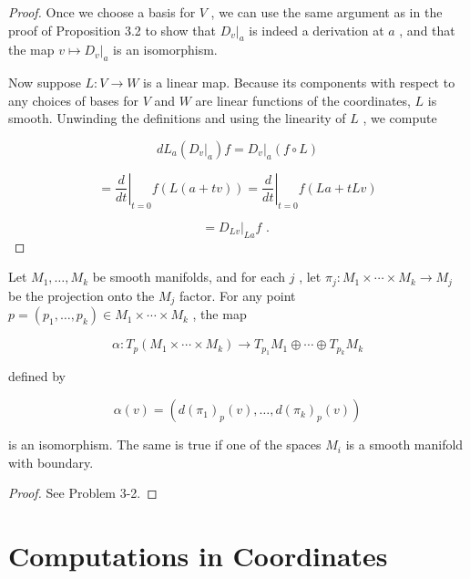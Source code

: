 \begin{proof}
\leanok
Once we choose a basis for $V$ , we can use the same argument as in the proof of Proposition 3.2 to show that ${\left. {D}_{v}\right| }_{a}$ is indeed a derivation at $a$ , and that the map $v \mapsto  {\left. {D}_{v}\right| }_{a}$ is an isomorphism.

Now suppose $L : V \rightarrow  W$ is a linear map. Because its components with respect to any choices of bases for $V$ and $W$ are linear functions of the coordinates, $L$ is smooth. Unwinding the definitions and using the linearity of $L$ , we compute

\[
d{L}_{a}\left( {\left. {D}_{v}\right| }_{a}\right) f = {\left. {D}_{v}\right| }_{a}\left( {f \circ  L}\right)
\]

\[
= {\left. \frac{d}{dt}\right| }_{t = 0}f\left( {L\left( {a + {tv}}\right) }\right)  = {\left. \frac{d}{dt}\right| }_{t = 0}f\left( {{La} + {tLv}}\right)
\]

\[
= {\left. {D}_{Lv}\right| }_{La}f\text{ . }
\]
\end{proof}

\begin{proposition}
\label{prop:3-14}
\leanok
{}
Let ${M}_{1},\ldots ,{M}_{k}$ be smooth manifolds, and for each $j$ , let ${\pi }_{j} : {M}_{1} \times  \cdots  \times  {M}_{k} \rightarrow  {M}_{j}$ be the projection onto the ${M}_{j}$ factor. For any point $p = \left( {{p}_{1},\ldots ,{p}_{k}}\right)  \in  {M}_{1} \times  \cdots  \times  {M}_{k}$ , the map

\[
\alpha  : {T}_{p}\left( {{M}_{1} \times  \cdots  \times  {M}_{k}}\right)  \rightarrow  {T}_{{p}_{1}}{M}_{1} \oplus  \cdots  \oplus  {T}_{{p}_{k}}{M}_{k}
\]

defined by

\[
\alpha \left( v\right)  = \left( {d{\left( {\pi }_{1}\right) }_{p}\left( v\right) ,\ldots , d{\left( {\pi }_{k}\right) }_{p}\left( v\right) }\right) \tag{3.7}
\]

is an isomorphism. The same is true if one of the spaces ${M}_{i}$ is a smooth manifold with boundary.
\end{proposition}

\begin{proof}
\leanok
See Problem 3-2.
\end{proof}


\section{Computations in Coordinates}

